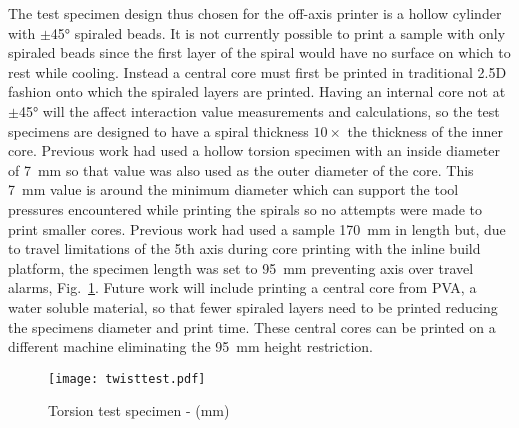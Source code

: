 \documentclass[main.tex]{subfiles}
\begin{document}
The test specimen design thus chosen for the off-axis printer is a hollow cylinder with $\pm$\ang{45} spiraled beads.
It is not currently possible to print a sample with only spiraled beads since the first layer of the spiral would have no surface on which to rest while cooling.
Instead a central core must first be printed in traditional 2.5D fashion onto which the spiraled layers are printed.
Having an internal core not at $\pm$\ang{45} will the affect interaction value measurements and calculations, so the test specimens are designed to have a spiral thickness $10\times$ the thickness of the inner core.
Previous work had used a hollow torsion specimen with an inside diameter of \SI{7}{mm} so that value was also used as the outer diameter of the core.
This \SI{7}{mm} value is around the minimum diameter which can support the tool pressures encountered while printing the spirals so no attempts were made to print smaller cores.
Previous work had used a sample \SI{170}{mm} in length but, due to travel limitations of the 5th axis during core printing with the inline build platform, the specimen length was set to \SI{95}{mm} preventing axis over travel alarms, Fig.~\ref{fig:torsionspecimen}.
Future work will include printing a central core from PVA, a water soluble material, so that fewer spiraled layers need to be printed reducing the specimens diameter and print time.
These central cores can be printed on a different machine eliminating the \SI{95}{mm} height restriction.

\begin{figure}
        \texttt{[image: twisttest.pdf]}
        \caption{Torsion test specimen - (\si{mm})}%
        \label{fig:torsionspecimen}
\end{figure}
\end{document}
